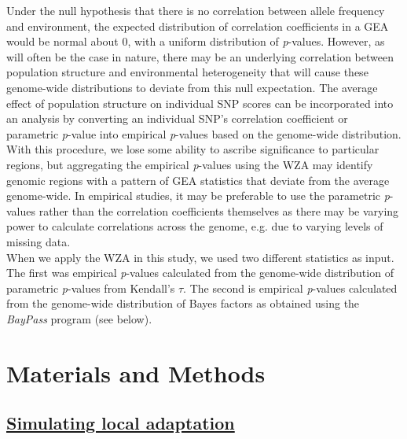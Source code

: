 \documentclass[10pt,twoside,lineno, twocolumn]{GSA_format}
\begin{document}
Under the null hypothesis that there is no correlation between allele frequency and environment, the expected distribution of correlation coefficients in a GEA would be normal about 0, with a uniform distribution of \textit{p}-values. However, as will often be the case in nature, there may be an underlying correlation between population structure and environmental heterogeneity that will cause these genome-wide distributions to deviate from this null expectation. The average effect of population structure on individual SNP scores can be incorporated into an analysis by converting an individual SNP's correlation coefficient or parametric \textit{p}-value into empirical \textit{p}-values based on the genome-wide distribution. With this procedure, we lose some ability to ascribe significance to particular regions, but aggregating the empirical \textit{p}-values using the WZA may identify genomic regions with a pattern of GEA statistics that deviate from the average genome-wide. In empirical studies, it may be preferable to use the parametric \textit{p}-values rather than the correlation coefficients themselves as there may be varying power to calculate correlations across the genome, e.g. due to varying levels of missing data. \\

When we apply the WZA in this study, we used two different statistics as input. The first was empirical \textit{p}-values calculated from the genome-wide distribution of parametric \textit{p}-values from Kendall's $\tau$. The second is empirical \textit{p}-values calculated from the genome-wide distribution of Bayes factors as obtained using the \textit{BayPass} program (see below). 


\section{Materials and Methods}
\label{sec:materials:methods}


\subsection{\underline{Simulating local adaptation}} 
\end{document}

